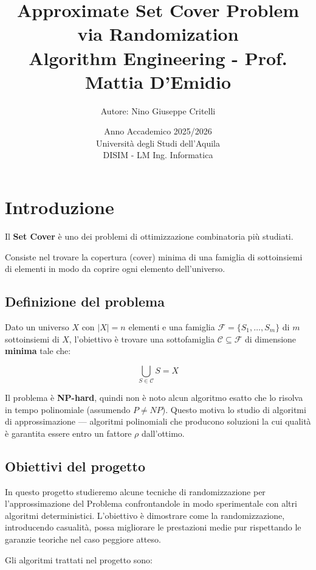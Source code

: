 \documentclass[12pt, a4paper]{article}
\title{
    \Large Approximate Set Cover Problem via Randomization \\[0.5em]
    \large Algorithm Engineering - Prof. Mattia D'Emidio
}
\author{Autore: Nino Giuseppe Critelli}
\date{Anno Accademico 2025/2026 \\ Universit\`a degli Studi dell'Aquila \\ DISIM - LM Ing. Informatica}
\begin{document}
\maketitle
\tableofcontents
\newpage

\section{Introduzione}
\label{sec:introduzione}

Il \textbf{Set Cover} è uno dei problemi di ottimizzazione combinatoria più studiati.

Consiste nel trovare la copertura (cover) minima di una famiglia di sottoinsiemi di elementi in modo da coprire ogni elemento dell'universo.

\subsection*{Definizione del problema}

Dato un universo $X$ con $|X| = n$ elementi e una famiglia $\mathcal{F} = \{S_1, \ldots, S_m\}$ 
di $m$ sottoinsiemi di $X$, l'obiettivo è trovare una sottofamiglia $\mathcal{C} \subseteq \mathcal{F}$ 
di dimensione \textbf{minima} tale che:

$$\bigcup_{S \in \mathcal{C}} S = X$$

Il problema è \textbf{NP-hard}, quindi non è noto alcun algoritmo esatto 
che lo risolva in tempo polinomiale (assumendo $P \neq NP$). Questo motiva lo studio di 
algoritmi di approssimazione — algoritmi polinomiali che producono soluzioni la cui qualità 
è garantita essere entro un fattore $\rho$ dall'ottimo.

\subsection*{Obiettivi del progetto}

In questo progetto studieremo alcune tecniche di randomizzazione per l'approssimazione del Problema confrontandole in modo sperimentale con altri algoritmi deterministici.
L'obiettivo è dimostrare come la randomizzazione, introducendo casualità, possa migliorare le prestazioni medie pur rispettando le garanzie teoriche nel caso peggiore atteso.

Gli algoritmi trattati nel progetto sono:
\end{document}
